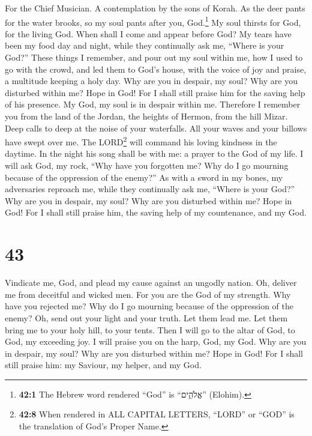 For the Chief Musician. A contemplation by the sons of Korah.
 As the deer pants for the water brooks, so my soul pants
after you, God.\footnote{\textbf{42:1} The Hebrew word rendered ``God''
  is ``אֱלֹהִ֑ים'' (Elohim).}  My soul thirsts for God,
for the living God. When shall I come and appear before God?
 My tears have been my food day and night, while they
continually ask me, ``Where is your God?''  These things I
remember, and pour out my soul within me, how I used to go with the
crowd, and led them to God's house, with the voice of joy and praise, a
multitude keeping a holy day.  Why are you in despair, my
soul? Why are you disturbed within me? Hope in God! For I shall still
praise him for the saving help of his presence.  My God,
my soul is in despair within me. Therefore I remember you from the land
of the Jordan, the heights of Hermon, from the hill Mizar.
 Deep calls to deep at the noise of your waterfalls. All
your waves and your billows have swept over me.  The
LORD\footnote{\textbf{42:8} When rendered in ALL CAPITAL LETTERS,
  ``LORD'' or ``GOD'' is the translation of God's Proper Name.} will
command his loving kindness in the daytime. In the night his song shall
be with me: a prayer to the God of my life.  I will ask
God, my rock, ``Why have you forgotten me? Why do I go mourning because
of the oppression of the enemy?''  As with a sword in my
bones, my adversaries reproach me, while they continually ask me,
``Where is your God?''  Why are you in despair, my soul?
Why are you disturbed within me? Hope in God! For I shall still praise
him, the saving help of my countenance, and my God.

\hypertarget{section-42}{%
\section{43}\label{section-42}}

 Vindicate me, God, and plead my cause against an ungodly
nation. Oh, deliver me from deceitful and wicked men.  For
you are the God of my strength. Why have you rejected me? Why do I go
mourning because of the oppression of the enemy?  Oh, send
out your light and your truth. Let them lead me. Let them bring me to
your holy hill, to your tents.  Then I will go to the
altar of God, to God, my exceeding joy. I will praise you on the harp,
God, my God.  Why are you in despair, my soul? Why are you
disturbed within me? Hope in God! For I shall still praise him: my
Saviour, my helper, and my God.


